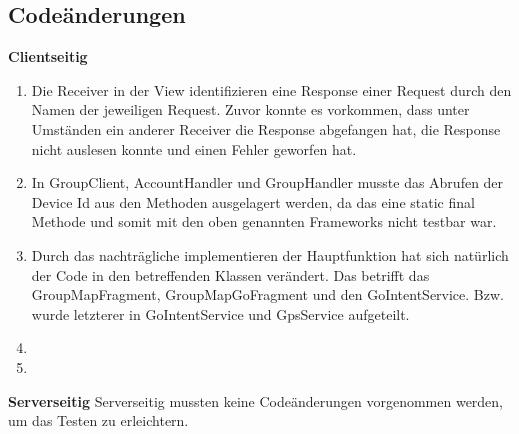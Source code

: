 \subsection{Codeänderungen}

	\textbf{Clientseitig}
	\begin{enumerate}
		\item Die Receiver in der View identifizieren eine Response einer Request durch den Namen der jeweiligen Request. Zuvor konnte es vorkommen, dass unter Umständen ein anderer Receiver die Response abgefangen hat, die Response nicht auslesen konnte und einen Fehler geworfen hat. 
		\item In GroupClient, AccountHandler und GroupHandler musste das Abrufen der Device Id aus den Methoden ausgelagert werden, da das eine static final Methode und somit mit den oben genannten Frameworks nicht testbar war.
		\item Durch das nachträgliche implementieren der Hauptfunktion hat sich natürlich der Code in den betreffenden Klassen verändert. Das betrifft das GroupMapFragment, GroupMapGoFragment und den GoIntentService. Bzw. wurde letzterer in GoIntentService und GpsService aufgeteilt.
		\item
		\item
	\end{enumerate}

	\textbf{Serverseitig}
	Serverseitig mussten keine Codeänderungen vorgenommen werden, um das Testen zu erleichtern.







